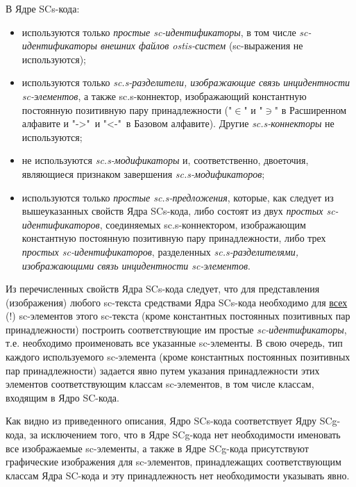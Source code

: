 В Ядре SCs-кода:
\begin{itemize}
	\item используются только \textit{простые sc-идентификаторы}, в том числе \textit{sc-идентификаторы внешних файлов ostis-систем} (sc-выражения не используются);
	\item используются только \textit{sc.s-разделители, изображающие связь инцидентности sc-элементов}, а также sc.s-коннектор, изображающий константную  постоянную позитивную пару принадлежности ("$\in$" и "$\ni$" в Расширенном алфавите и "{}->{}"\ и "{}<-{}"\ в Базовом алфавите). Другие \textit{sc.s-коннекторы} не используются;
	\item не используются \textit{sc.s-модификаторы} и, соответственно, двоеточия, являющиеся признаком завершения \textit{sc.s-модификаторов};
	\item используются только \textit{простые sc.s-предложения}, которые, как следует из вышеуказанных свойств Ядра SCs-кода, либо состоят из двух \textit{простых sc-идентификаторов}, соединяемых sc.s-коннектором, изображающим константную  постоянную позитивную пару принадлежности, либо трех \textit{простых sc-идентификаторов}, разделенных \textit{sc.s-разделителями, изображающими связь инцидентности sc-элементов}.
\end{itemize}


Из перечисленных свойств Ядра SCs-кода следует, что для представления (изображения) любого \mbox{sc-текста} средствами Ядра SCs-кода необходимо для \uline{всех} (!) sc-элементов этого \mbox{sc-текста} (кроме константных постоянных позитивных пар принадлежности) построить соответствующие им простые \textit{sc-идентификаторы}, т.е. необходимо проименовать все указанные sc-элементы. В свою очередь, тип каждого используемого \mbox{sc-элемента} (кроме константных постоянных позитивных пар принадлежности) задается явно путем указания принадлежности этих элементов соответствующим классам sc-элементов, в том числе классам, входящим в Ядро SC-кода.

Как видно из приведенного описания, Ядро SCs-кода соответствует Ядру SCg-кода, за исключением того, что в Ядре SCg-кода нет необходимости именовать все изображаемые sc-элементы, а также в Ядре SCg-кода присутствуют графические изображения для sc-элементов, принадлежащих соответствующим классам Ядра SC-кода и эту принадлежность нет необходимости указывать явно.

